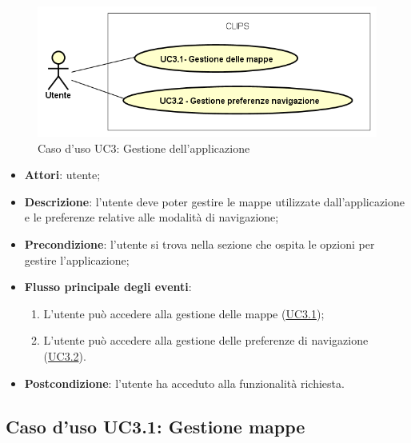 \documentclass[../AnalisiDeiRequisiti.tex]{subfiles}
\begin{document}
\begin{figure}[H]
	\centering
	\includegraphics[scale=0.95, width=\textwidth]{img/UC3.png}
	\caption{Caso d'uso UC3: Gestione dell'applicazione}\label{fig:UC3} 
\end{figure}
\begin{itemize}
	\item \textbf{Attori}: utente;
	\item \textbf{Descrizione}: l'utente deve poter gestire le mappe utilizzate dall'applicazione e le preferenze relative alle modalità di navigazione; 
	\item \textbf{Precondizione}: l'utente si trova nella sezione che ospita le opzioni per gestire l'applicazione;
	
	\item \textbf{Flusso principale degli eventi}:
	\begin{enumerate}
		\item L'utente può accedere alla gestione delle mappe (\hyperlink{UC3.1}{UC3.1});
		\item L'utente può accedere alla gestione delle preferenze di navigazione (\hyperlink{UC3.2}{UC3.2}).
		
	\end{enumerate}
	\item \textbf{Postcondizione}: l'utente ha acceduto alla funzionalità richiesta.
\end{itemize}
\hypertarget{UC3.1}{}
\subsection{Caso d'uso UC3.1: Gestione mappe}
\end{document}
